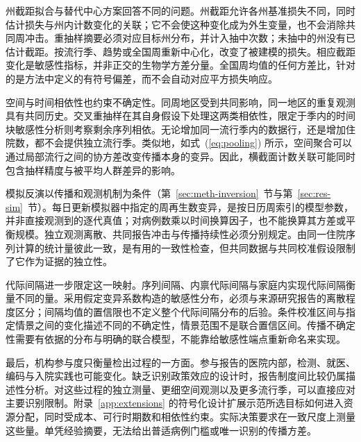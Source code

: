 州截距拟合与替代中心方案回答不同的问题。州截距允许各州基准损失不同，同时估计损失与州内计数变化的关联；它不会使这种变化成为外生变量，也不会消除共同周冲击。重抽样摘要必须对应目标州分布，并计入抽中次数；未抽中的州没有已估计截距。按流行季、趋势或全国周重新中心化，改变了被建模的损失。相应截距变化是敏感性指标，并非正交的生物学方差分量。全国周均值的任何方差比，针对的是方法中定义的有符号偏差，而不会自动对应平方损失响应。

空间与时间相依性也约束不确定性。同周地区受到共同影响，同一地区的重复观测具有共同历史。交叉重抽样在其自身假设下处理这两类相依性\citep{owen2007pigeonhole, cameron2011robust}，限定于季内的时间块敏感性分析则考察剩余序列相依。无论增加同一流行季内的数据行，还是增加住院数，都不会提供独立流行季。类似地，如式~(\ref{eq:pooling}) 所示，空间聚合可以通过局部流行之间的协方差改变传播本身的变异。因此，横截面计数关联可能同时包含抽样精度与被平均人群差异的影响。

模拟反演以传播和观测机制为条件（第~\ref{sec:meth-inversion}~节与第~\ref{sec:res-sim}~节）。每日更新模拟器中指定的周再生数变异，是按日历周索引的模型参数，并非直接观测到的逐代真值；对病例数乘以时间换算因子，也不能换算其方差或平衡规模。独立观测离散、共同报告冲击与传播持续性必须分别规定。由同一住院序列计算的统计量彼此一致，是有用的一致性检查，但共同数据与共同校准假设限制了它作为证据的独立性。

代际间隔进一步限定这一映射。序列间隔、内禀代际间隔与家庭内实现代际间隔衡量不同的量\citep{cowling2009estimation, vink2014serial, chan2025estimating}。采用假定变异系数构造的敏感性分布，必须与来源研究报告的离散程度区分；间隔均值的置信限也不定义整个代际间隔分布的后验。条件校准区间与指定情景之间的变化描述不同的不确定性，情景范围不是联合置信区间。传播不确定性需要有依据的分布与明确的联合模型，不能靠给敏感性端点重新命名来实现。

最后，机构参与度只衡量检出过程的一方面。参与报告的医院内部，检测、就医、编码与入院实践也可能变化。缺乏识别政策效应的设计时，报告制度间比较仍属描述性分析。对这些过程的独立测量、更细空间观测以及更多流行季，可以直接应对主要识别限制。附录~\ref{app:extensions} 的符号化设计扩展示范所选目标如何进入资源分配，同时受成本、可行时期数和相依性约束。实际决策要求在一致尺度上测量这些量。单凭经验摘要，无法给出普适病例门槛或唯一识别的传播方差。
